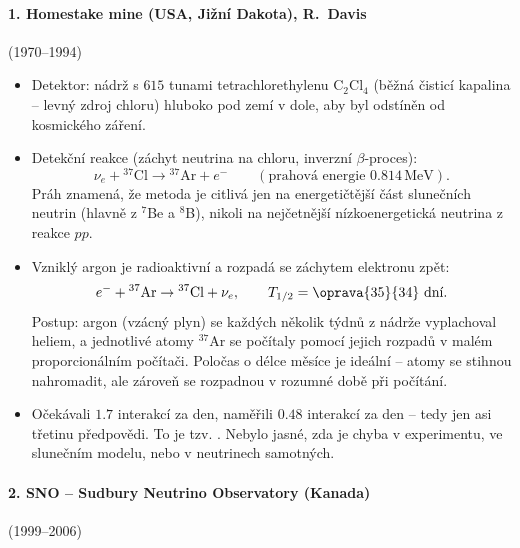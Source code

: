 \paragraph{1. Homestake mine (USA, Jižní Dakota), R.~Davis} (1970--1994)
\begin{itemize}[nosep]
  \item Detektor: nádrž s \(615\) tunami tetrachlorethylenu \(\mathrm{C_2Cl_4}\) (běžná čisticí kapalina -- levný zdroj chloru) hluboko pod zemí v dole, aby byl odstíněn od kosmického záření.
  \item Detekční reakce (záchyt neutrina na chloru, inverzní \(\beta\)-proces):
  \[
    \nu_e+{}^{37}\mathrm{Cl}\to{}^{37}\mathrm{Ar}+e^-\qquad(\text{prahová energie }0.814\,\mathrm{MeV}).
  \]
  Práh znamená, že metoda je citlivá jen na energetičtější část slunečních neutrin (hlavně z \(^7\)Be a \(^8\)B), nikoli na nejčetnější nízkoenergetická neutrina z reakce \(pp\).
  \item Vzniklý argon je radioaktivní a rozpadá se záchytem elektronu zpět:
  \[
    e^-+{}^{37}\mathrm{Ar}\to{}^{37}\mathrm{Cl}+\nu_e,\qquad T_{1/2}=\oprava{35}{34}\ \text{dní}.
  \]
  Postup: argon (vzácný plyn) se každých několik týdnů z nádrže vyplachoval heliem, a jednotlivé atomy \(^{37}\)Ar se počítaly pomocí jejich rozpadů v malém proporcionálním počítači. Poločas o délce měsíce je ideální -- atomy se stihnou nahromadit, ale zároveň se rozpadnou v rozumné době při počítání.
  \item Očekávali \(1.7\) interakcí za den, naměřili \(0.48\) interakcí za den -- tedy jen asi třetinu předpovědi. To je tzv. . Nebylo jasné, zda je chyba v experimentu, ve slunečním modelu, nebo v neutrinech samotných.
\end{itemize}

\paragraph{2. SNO -- Sudbury Neutrino Observatory (Kanada)} (1999--2006)


